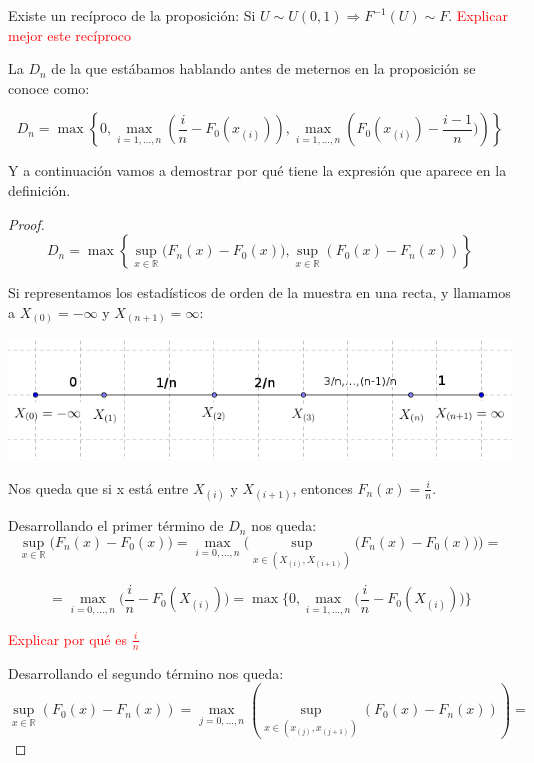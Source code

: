\documentclass[nochap]{apuntes}
\begin{document}
\begin{obs}
Existe un recíproco de la proposición: Si $U \sim U(0,1) \Rightarrow F^{-1}(U) \sim F$. \textcolor{red}{Explicar mejor este recíproco}
\end{obs}

La $D_n$ de la que estábamos hablando antes de meternos en la proposición se conoce como:

\begin{defn}
	\[D_n = \max \left\{ 0, \max_{i=1,…,n} \left( \frac{i}{n} - F_0(x_{(i)}) \right), \max_{i=1,…,n} \left(F_0(x_{(i)}) - \frac{i-1}{n})\right) \right\}\]
\end{defn}

Y a continuación vamos a demostrar por qué tiene la expresión que aparece en la definición.
\begin{proof}

$$ D_n = \max \left\{ \sup_{x\in\mathbb{R}} \Big( F_n(x)-F_0(x)\Big), \sup_{x\in\mathbb{R}} \left( F_0(x)-F_n(x)\right) \right\} $$

Si representamos los estadísticos de orden de la muestra en una recta, y llamamos a $X_{(0)}=-\infty$ y $X_{(n+1)}=\infty$:

\includegraphics[scale=0.5]{img/contrasteks2.png}

Nos queda que si x está entre $X_{(i)}$ y $X_{(i+1)}$, entonces $F_n(x)=\frac{i}{n}$.

Desarrollando el primer término de $D_n$ nos queda:
$$ \sup_{x\in\mathbb{R}} \Big( F_n(x)-F_0(x)\Big) = \max_{i=0,...,n} \Bigg(\sup_{x\in(X_{(i)},X_{(i+1)})} \Big( F_n(x)-F_0(x)\Big) \Bigg) = $$

$$ = \max_{i=0,...,n} \Big( \frac{i}{n} - F_0(X_{(i)}) \Big) = \max\Big\{ 0, \max_{i=1,...,n} \Big( \frac{i}{n} - F_0(X_{(i)}) \Big) \Big\}$$

\textcolor{red}{Explicar por qué es $\frac{i}{n}$} %

Desarrollando el segundo término nos queda:
\[\sup_{x∈ℝ}\left( F_0(x) - F_n(x) \right) = \max_{j=0,…,n} \left( \sup_{x∈(x_{(j)},x_{(j+1)})} \left( F_0(x) - F_n(x) \right) \right) =\]


\end{proof}
\end{document}
